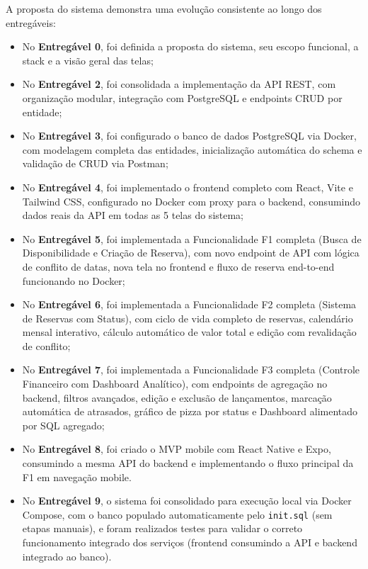 \documentclass[12pt, a4paper]{article}
\begin{document}
A proposta do sistema demonstra uma evolução consistente ao longo dos entregáveis:

\begin{itemize}[leftmargin=1.5em]
  \item No \textbf{Entregável 0}, foi definida a proposta do sistema, seu escopo funcional, a stack e a visão geral das telas;
  \item No \textbf{Entregável 2}, foi consolidada a implementação da API REST, com organização modular, integração com PostgreSQL e endpoints CRUD por entidade;
  \item No \textbf{Entregável 3}, foi configurado o banco de dados PostgreSQL via Docker, com modelagem completa das entidades, inicialização automática do schema e validação de CRUD via Postman;
  \item No \textbf{Entregável 4}, foi implementado o frontend completo com React, Vite e Tailwind CSS, configurado no Docker com proxy para o backend, consumindo dados reais da API em todas as 5 telas do sistema;
  \item No \textbf{Entregável 5}, foi implementada a Funcionalidade F1 completa (Busca de Disponibilidade e Criação de Reserva), com novo endpoint de API com lógica de conflito de datas, nova tela no frontend e fluxo de reserva end-to-end funcionando no Docker;
  \item No \textbf{Entregável 6}, foi implementada a Funcionalidade F2 completa (Sistema de Reservas com Status), com ciclo de vida completo de reservas, calendário mensal interativo, cálculo automático de valor total e edição com revalidação de conflito;
  \item No \textbf{Entregável 7}, foi implementada a Funcionalidade F3 completa (Controle Financeiro com Dashboard Analítico), com endpoints de agregação no backend, filtros avançados, edição e exclusão de lançamentos, marcação automática de atrasados, gráfico de pizza por status e Dashboard alimentado por SQL agregado;
  \item No \textbf{Entregável 8}, foi criado o MVP mobile com React Native e Expo, consumindo a mesma API do backend e implementando o fluxo principal da F1 em navegação mobile.
  \item No \textbf{Entregável 9}, o sistema foi consolidado para execução local via Docker Compose, com o banco populado automaticamente pelo \texttt{init.sql} (sem etapas manuais), e foram realizados testes para validar o correto funcionamento integrado dos serviços (frontend consumindo a API e backend integrado ao banco).
\end{itemize}
\end{document}
